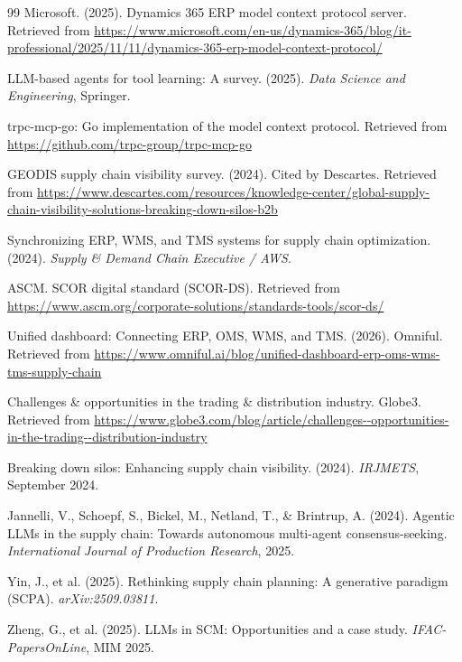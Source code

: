 \documentclass[12pt,a4paper]{report}
\begin{document}
\begin{thebibliography}{99}
Microsoft. (2025). Dynamics 365 ERP model context protocol server. Retrieved from \url{https://www.microsoft.com/en-us/dynamics-365/blog/it-professional/2025/11/11/dynamics-365-erp-model-context-protocol/}

LLM-based agents for tool learning: A survey. (2025). \textit{Data Science and Engineering}, Springer.

trpc-mcp-go: Go implementation of the model context protocol. Retrieved from \url{https://github.com/trpc-group/trpc-mcp-go}

GEODIS supply chain visibility survey. (2024). Cited by Descartes. Retrieved from \url{https://www.descartes.com/resources/knowledge-center/global-supply-chain-visibility-solutions-breaking-down-silos-b2b}

Synchronizing ERP, WMS, and TMS systems for supply chain optimization. (2024). \textit{Supply \& Demand Chain Executive / AWS}.

ASCM. SCOR digital standard (SCOR-DS). Retrieved from \url{https://www.ascm.org/corporate-solutions/standards-tools/scor-ds/}

Unified dashboard: Connecting ERP, OMS, WMS, and TMS. (2026). Omniful. Retrieved from \url{https://www.omniful.ai/blog/unified-dashboard-erp-oms-wms-tms-supply-chain}

Challenges \& opportunities in the trading \& distribution industry. Globe3. Retrieved from \url{https://www.globe3.com/blog/article/challenges--opportunities-in-the-trading--distribution-industry}

Breaking down silos: Enhancing supply chain visibility. (2024). \textit{IRJMETS}, September 2024.

Jannelli, V., Schoepf, S., Bickel, M., Netland, T., \& Brintrup, A. (2024). Agentic LLMs in the supply chain: Towards autonomous multi-agent consensus-seeking. \textit{International Journal of Production Research}, 2025.

Yin, J., et al. (2025). Rethinking supply chain planning: A generative paradigm (SCPA). \textit{arXiv:2509.03811}.

Zheng, G., et al. (2025). LLMs in SCM: Opportunities and a case study. \textit{IFAC-PapersOnLine}, MIM 2025.


\end{thebibliography}
\end{document}
